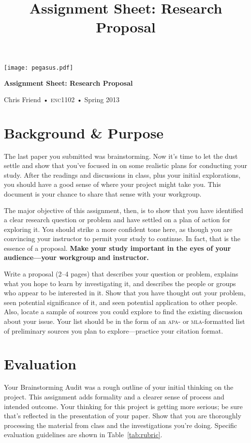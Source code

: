 \documentclass[12pt, twosides]{amsart}	%
\title[Research Proposal]{Assignment Sheet: Research Proposal}
\begin{document}
%
\thispagestyle{empty}

\vspace{-2in}
\begin{center}
\huge
\texttt{[image: pegasus.pdf]}

\textbf{Assignment Sheet: Research Proposal}

{\normalsize Chris Friend • \textsc{enc1102} • Spring 2013}
\end{center}
\vspace{1.5\baselineskip}

\section{Background \& Purpose} %
\label{sec:background}
The last paper you submitted was brainstorming. Now it's time to let the dust settle and show that you've focused in on some realistic plans for conducting your study. After the readings and discussions in class, plus your initial explorations, you should have a good sense of where your project might take you. This document is your chance to share that sense with your workgroup.

The major objective of this assignment, then, is to show that you have identified a clear research question or problem and have settled on a plan of action for exploring it. You should strike a more confident tone here, as though you are convincing your instructor to permit your study to continue. In fact, that is the essence of a proposal. \textbf{Make your study important in the eyes of your audience—your workgroup and instructor.}

Write a proposal (2--4 pages) that describes your question or problem, explains what you hope to learn by investigating it, and describes the people or groups who appear to be interested in it. Show that you have thought out your problem, seen potential significance of it, and seen potential application to other people. Also, locate a sample of sources you could explore to find the existing discussion about your issue. Your list should be in the form of an \textsc{apa}- or \textsc{mla}-formatted list of preliminary sources you plan to explore---practice your citation format.

\section{Evaluation} %
\label{sec:evaluation}
Your Brainstorming Audit was a rough outline of your initial thinking on the project. This assignment adds formality and a clearer sense of process and intended outcome. Your thinking for this project is getting more serious; be sure that's reflected in the presentation of your paper. Show that you are thoroughly processing the material from class and the investigations you're doing. Specific evaluation guidelines are shown in Table~\ref{tab:rubric}.
\end{document}
